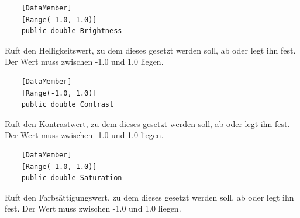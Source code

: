 \begin{itemize}

	\begin{verbatim}
	[DataMember]
	[Range(-1.0, 1.0)]
	public double Brightness
	\end{verbatim}
	Ruft den Helligkeitswert, zu dem dieses  gesetzt werden soll, ab oder legt ihn fest. Der Wert muss zwischen -1.0 und 1.0 liegen.
	
	\begin{verbatim}
	[DataMember]
	[Range(-1.0, 1.0)]
	public double Contrast
	\end{verbatim}
	Ruft den Kontrastwert, zu dem dieses  gesetzt werden soll, ab oder legt ihn fest. Der Wert muss zwischen -1.0 und 1.0 liegen.
	
	\begin{verbatim}
	[DataMember]
	[Range(-1.0, 1.0)]
	public double Saturation
	\end{verbatim}
	Ruft den Farbsättigungswert, zu dem dieses  gesetzt werden soll, ab oder legt ihn fest. Der Wert muss zwischen -1.0 und 1.0 liegen.


\end{itemize}
